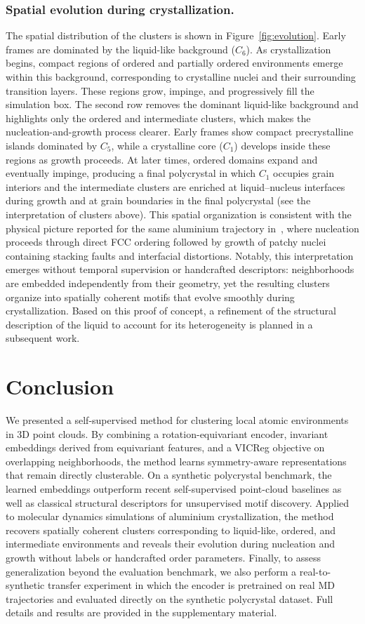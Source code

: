 \documentclass[runningheads]{llncs}
\begin{document}
\subsubsection{Spatial evolution during crystallization.}
The spatial distribution of the clusters is shown in Figure~\ref{fig:evolution}.
Early frames are dominated by the liquid-like background ($C_6$).
As crystallization begins, compact regions of ordered and partially ordered environments emerge within this background, corresponding to crystalline nuclei and their surrounding transition layers.
These regions grow, impinge, and progressively fill the simulation box.
The second row removes the dominant liquid-like background and highlights only the ordered and intermediate clusters, which makes the nucleation-and-growth process clearer.
Early frames show compact precrystalline islands dominated by $C_5$, while a crystalline core ($C_1$) develops inside these regions as growth proceeds.
At later times, ordered domains expand and eventually impinge, producing a final polycrystal in which $C_1$ occupies grain interiors and the intermediate clusters are enriched at liquid--nucleus interfaces during growth and at grain boundaries in the final polycrystal (see the interpretation of clusters above).
This spatial organization is consistent with the physical picture reported for the same aluminium trajectory in~\cite{becker2022nucleation}, where nucleation proceeds through direct FCC ordering followed by growth of patchy nuclei containing stacking faults and interfacial distortions.
Notably, this interpretation emerges without temporal supervision or handcrafted descriptors: neighborhoods are embedded independently from their geometry, yet the resulting clusters organize into spatially coherent motifs that evolve smoothly during crystallization.
Based on this proof of concept, a refinement of the structural description of the liquid to account for its heterogeneity is planned in a subsequent work.

\section{Conclusion}
We presented a self-supervised method for clustering local atomic environments in 3D point clouds. By combining a rotation-equivariant encoder, invariant embeddings derived from equivariant features, and a VICReg objective on overlapping neighborhoods, the method learns symmetry-aware representations that remain directly clusterable. On a synthetic polycrystal benchmark, the learned embeddings outperform recent self-supervised point-cloud baselines as well as classical structural descriptors for unsupervised motif discovery. Applied to molecular dynamics simulations of aluminium crystallization, the method recovers spatially coherent clusters corresponding to liquid-like, ordered, and intermediate environments and reveals their evolution during nucleation and growth without labels or handcrafted order parameters. Finally, to assess generalization beyond the evaluation benchmark, we also perform a real-to-synthetic transfer experiment in which the encoder is pretrained on real MD trajectories and evaluated directly on the synthetic polycrystal dataset. Full details and results are provided in the supplementary material.
\end{document}
